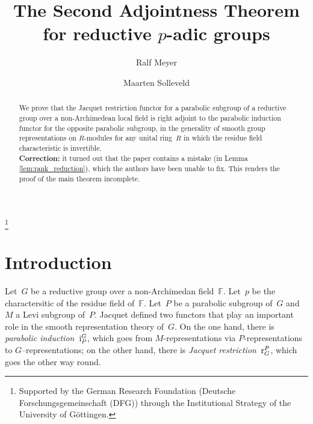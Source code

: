 \documentclass{amsart}
\theoremstyle{remark}
\theoremstyle{definition}
\newcommand*{\Jaci}{\textup i}%
\newcommand*{\Jacr}{\textup r}%
\newcommand*{\nb}{\nobreakdash}%
\newcommand*{\F}{\mathbb F}%
\newcommand{\ring}{R}%
\begin{document}

\title{The Second Adjointness Theorem for reductive \(p\)-adic groups}
\author{Ralf Meyer}
\author{Maarten Solleveld}
\address{Mathematisches Institut and Courant Centre ``Higher order structures''\\Georg-August Universit\"at G\"ottingen\\Bunsenstra{\ss}e 3--5\\37073 G\"ottingen\\Germany}

\begin{abstract}
  We prove that the Jacquet restriction functor for a parabolic subgroup of a reductive group over a non-Archimedean local field is right adjoint to the parabolic induction functor for the opposite parabolic subgroup, in the generality of smooth group representations on \(\ring\)\nb-modules for any unital ring~\(\ring\) in which the residue field characteristic is invertible.\\
\textbf{Correction:} it turned out that the paper contains a mistake (in Lemma \ref{lem:rank_reduction}), which the authors
have been unable to fix. This renders the proof of the main theorem incomplete.
\end{abstract}

\thanks{Supported by the German Research Foundation (Deutsche Forschungsgemeinschaft (DFG)) through the Institutional Strategy of the University of G\"ottingen.}
\maketitle


\section{Introduction}
\label{sec:intro}

Let~\(G\) be a reductive group over a non-Archimedan field~\(\F\).  Let~\(p\) be the charactersitic of the residue field of~\(\F\).  Let~\(P\) be a parabolic subgroup of~\(G\) and~\(M\) a Levi subgroup of~\(P\).  Jacquet defined two functors that play an important role in the smooth representation theory of~\(G\).  On the one hand, there is \emph{parabolic induction~\(\Jaci_P^G\)}, which goes from \(M\)\nb-representations via \(P\)\nb-representations to \(G\)\nb--representations; on the other hand, there is \emph{Jacquet restriction~\(\Jacr^P_G\)}, which goes the other way round.
\end{document}
